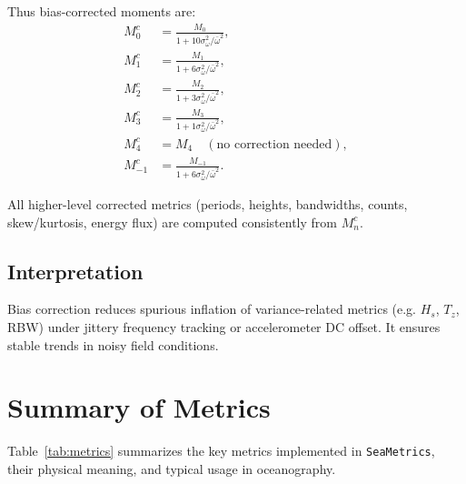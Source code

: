 \documentclass[11pt]{article}
\begin{document}
Thus bias-corrected moments are:
\begin{align}
M_0^c &= \frac{M_0}{1 + 10 \sigma_\omega^2 / \bar{\omega}^2}, \\
M_1^c &= \frac{M_1}{1 + 6 \sigma_\omega^2 / \bar{\omega}^2}, \\
M_2^c &= \frac{M_2}{1 + 3 \sigma_\omega^2 / \bar{\omega}^2}, \\
M_3^c &= \frac{M_3}{1 + 1 \sigma_\omega^2 / \bar{\omega}^2}, \\
M_4^c &= M_4 \quad (\text{no correction needed}), \\
M_{-1}^c &= \frac{M_{-1}}{1 + 6 \sigma_\omega^2 / \bar{\omega}^2}.
\end{align}

All higher-level corrected metrics (periods, heights, bandwidths, counts, skew/kurtosis, energy flux) are computed consistently from $M_n^c$.

\subsection{Interpretation}

Bias correction reduces spurious inflation of variance-related metrics (e.g. $H_s$, $T_z$, RBW) under jittery frequency tracking or accelerometer DC offset.  
It ensures stable trends in noisy field conditions.

\section{Summary of Metrics}

Table~\ref{tab:metrics} summarizes the key metrics implemented in
\texttt{SeaMetrics}, their physical meaning, and typical usage in
oceanography.
\end{document}
